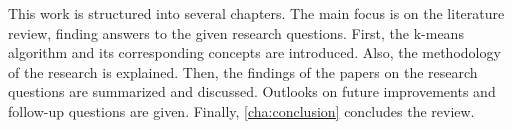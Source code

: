 This work is structured into several chapters.
The main focus is on the literature review, finding answers to the given research questions.
First, the k-means algorithm and its corresponding concepts are introduced.
Also, the methodology of the research is explained.
Then, the findings of the papers on the research questions are summarized and discussed.
Outlooks on future improvements and follow-up questions are given.
Finally, \autoref{cha:conclusion} concludes the review.